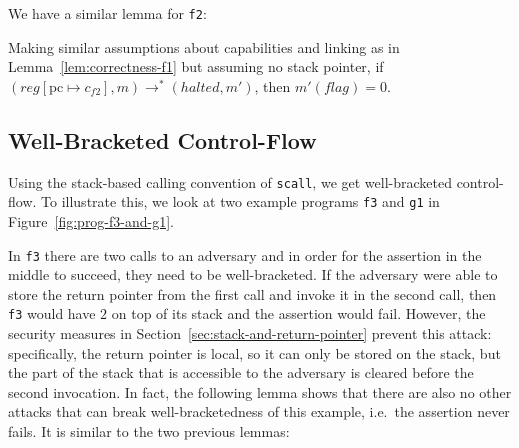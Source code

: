 \documentclass[format=acmsmall, review=false, screen=true]{acmart}
\renewcommand{\figurename}{Figure}
\renewcommand{\sectionname}{Section}
\newcommand{\update}[2]{[#1 \mapsto #2]}
\newcommand{\var}[1]{\mathit{#1}}
\newcommand{\pcreg}{\mathrm{pc}}
\newcommand{\reg}{\var{reg}}
\newcommand{\flag}{\var{flag}}
\newcommand{\halted}{\mathit{halted}}
\newcommand{\step}[1][]{\rightarrow_{#1}}
\begin{document}
We have a similar lemma for \texttt{\footnotesize{f2}}:
\begin{lemma}
  \label{lem:correctness-f2}
  Making similar assumptions about capabilities and linking as in
  Lemma~\ref{lem:correctness-f1} but assuming no stack pointer,
  if $(\reg\update{\pcreg}{c_{f2}},m) \step^* (\halted,m')$, then $m'(\flag) = 0$.
\end{lemma}

\subsection{Well-Bracketed Control-Flow} 
Using the stack-based calling convention of \texttt{\footnotesize{scall}}, we get
well-bracketed control-flow. To illustrate this, we look at
two example programs \texttt{\footnotesize{f3}} and
\texttt{\footnotesize{g1}} in \figurename~\ref{fig:prog-f3-and-g1}.

In \texttt{\footnotesize{f3}} there are two calls to an adversary and in order
for the assertion in the middle to succeed, they need to be well-bracketed. If
the adversary were able to store the return pointer from the first call and
invoke it in the second call, then \texttt{\footnotesize{f3}} would have $2$ on
top of its stack and the assertion would fail. However, the security measures in
\sectionname~\ref{sec:stack-and-return-pointer} prevent this attack: specifically,
the return pointer is local, so it can only be stored on the stack, but the part
of the stack that is accessible to the adversary is cleared before the second
invocation. In fact, the following lemma shows that there are also no other
attacks that can break well-bracketedness of this example, i.e.\ the assertion
never fails. It is similar to the two previous lemmas:
\end{document}
